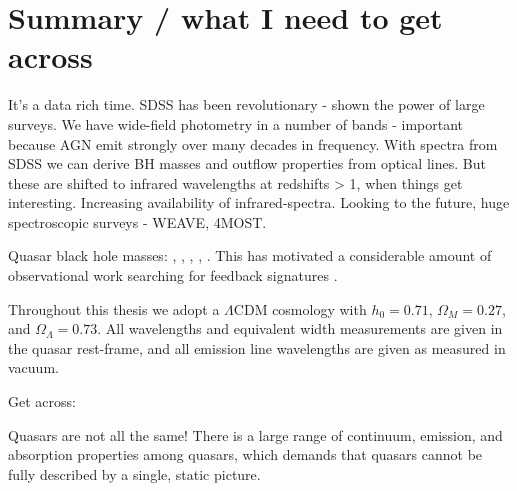 \section{Summary / what I need to get across}

It's a data rich time.
SDSS has been revolutionary - shown the power of large surveys. 
We have wide-field photometry in a number of bands - important because AGN emit strongly over many decades in frequency. 
With spectra from SDSS we can derive BH masses and outflow properties from optical lines. 
But these are shifted to infrared wavelengths at redshifts > 1, when things get interesting. 
Increasing availability of infrared-spectra. 
Looking to the future, huge spectroscopic surveys - WEAVE, 4MOST. 

Quasar black hole masses: \citet{shen13}, \citet{peterson10}, \citet{peterson11}, \citet{vestergaard11}, \citet{marziani12}. 
This has motivated a considerable amount of observational work searching for feedback signatures \citep[for recent reviews, see][]{alexander12,fabian12,heckman14}. 

Throughout this thesis we adopt a $\Lambda$CDM cosmology with $h_0=0.71$, $\Omega_M=0.27$, and $\Omega_\Lambda=0.73$. 
All wavelengths and equivalent width measurements are given in the quasar rest-frame, and all emission line wavelengths are given as measured in vacuum.

Get across: 

Quasars are not all the same!
There is a large range of continuum, emission, and absorption properties among quasars, which demands that quasars cannot be fully described by a single, static picture. 














